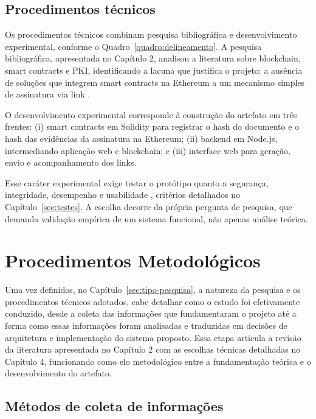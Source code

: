 \documentclass[
    12pt,
    a4paper,
    oneside,
    chapter=TITLE,
    section=TITLE,
    subsection=TITLE,
    subsubsection=TITLE,
    sumario=tradicional,
    english,
    brazil
]{abntex2}
\begin{document}
\subsection{Procedimentos técnicos}
\label{sec:procedimentos-tecnicos}

Os procedimentos técnicos combinam pesquisa bibliográfica e desenvolvimento experimental, conforme o Quadro~\ref{quadro:delineamento}. A pesquisa bibliográfica, apresentada no Capítulo 2, analisou a literatura sobre blockchain, smart contracts e PKI, identificando a lacuna que justifica o projeto: a ausência de soluções que integrem smart contracts na Ethereum a um mecanismo simples de assinatura via link \cite{buterin2014,alharby2017}.

O desenvolvimento experimental corresponde à construção do artefato em três frentes: (i) smart contracts em Solidity para registrar o hash do documento e o hash das evidências da assinatura na Ethereum; (ii) backend em Node.js, intermediando aplicação web e blockchain; e (iii) interface web para geração, envio e acompanhamento dos links.

Esse caráter experimental exige testar o protótipo quanto a segurança, integridade, desempenho e usabilidade \cite{stallings2017}, critérios detalhados no Capítulo~\ref{sec:testes}. A escolha decorre da própria pergunta de pesquisa, que demanda validação empírica de um sistema funcional, não apenas análise teórica.

\section{Procedimentos Metodológicos}
\label{sec:proc-metodologicos}

Uma vez definidos, no Capítulo~\ref{sec:tipo-pesquisa}, a natureza da pesquisa e os procedimentos técnicos adotados, cabe detalhar como o estudo foi efetivamente conduzido, desde a coleta das informações que fundamentaram o projeto até a forma como essas informações foram analisadas e traduzidas em decisões de arquitetura e implementação do sistema proposto. Essa etapa articula a revisão da literatura apresentada no Capítulo 2 com as escolhas técnicas detalhadas no Capítulo 4, funcionando como elo metodológico entre a fundamentação teórica e o desenvolvimento do artefato.

\subsection{Métodos de coleta de informações}
\end{document}

